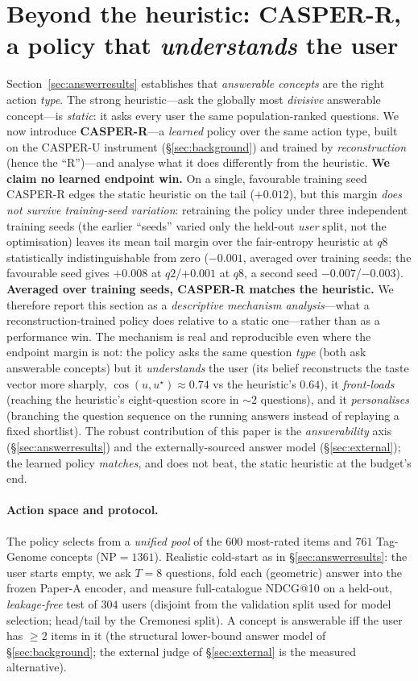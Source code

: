 \documentclass[11pt]{article}
\begin{document}
\section{Beyond the heuristic: \textbf{CASPER-R}, a policy that \emph{understands} the user}\label{sec:learned}
Section~\ref{sec:answerresults} establishes that \emph{answerable concepts} are the right action \emph{type}. The strong
heuristic---ask the globally most \emph{divisive} answerable concept---is \emph{static}: it asks every user the same
population-ranked questions. We now introduce \textbf{CASPER-R}---a \emph{learned} policy over the same action type, built on the CASPER-U instrument
(\S\ref{sec:background}) and trained by \emph{reconstruction} (hence the ``R'')---and analyse what it does differently
from the heuristic. \textbf{We claim no learned endpoint win.} On a single, favourable training seed CASPER-R edges the
static heuristic on the tail ($+0.012$), but this margin \emph{does not survive training-seed variation}: retraining the
policy under three independent training seeds (the earlier ``seeds'' varied only the held-out \emph{user} split, not the
optimisation) leaves its mean tail margin over the fair-entropy heuristic at $q8$ statistically indistinguishable from
zero ($-0.001$, averaged over training seeds; the favourable seed gives $+0.008$ at $q2$/$+0.001$ at $q8$, a second seed
$-0.007$/$-0.003$). \textbf{Averaged over training seeds, CASPER-R matches the heuristic.} We therefore report this
section as a \emph{descriptive mechanism analysis}---what a reconstruction-trained policy does relative to a static
one---rather than as a performance win. The mechanism is real and reproducible even where the endpoint margin is not: the
policy asks the same question \emph{type} (both ask answerable concepts) but it \emph{understands} the user (its belief
reconstructs the taste vector more sharply, $\cos(u,u^\star)\approx0.74$ vs the heuristic's $0.64$), it \emph{front-loads}
(reaching the heuristic's eight-question score in $\sim\!2$ questions), and it \emph{personalises} (branching the question
sequence on the running answers instead of replaying a fixed shortlist). The robust contribution of this paper is the
\emph{answerability} axis (\S\ref{sec:answerresults}) and the externally-sourced answer model (\S\ref{sec:external});
the learned policy \emph{matches}, and does not beat, the static heuristic at the budget's end.

\paragraph{Action space and protocol.} The policy selects from a \emph{unified pool} of the $600$ most-rated items and
$761$ Tag-Genome concepts ($\mathrm{NP}{=}1361$). Realistic cold-start as in \S\ref{sec:answerresults}: the user starts
empty, we ask $T{=}8$ questions, fold each (geometric) answer into the frozen Paper-A encoder, and measure
full-catalogue NDCG@10 on a held-out, \emph{leakage-free} test of $304$ users (disjoint from the validation split used
for model selection; head/tail by the Cremonesi split). A concept is answerable iff the user has $\ge 2$ items in it (the
structural lower-bound answer model of \S\ref{sec:background}; the external judge of \S\ref{sec:external} is the measured
alternative).
\end{document}

